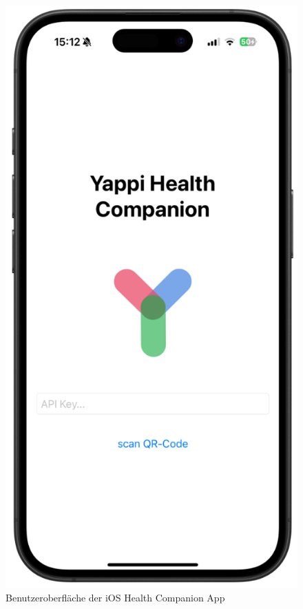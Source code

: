 \documentclass[12pt,a4paper]{report}
\begin{document}
\begin{figure}[H]
  \centering
  \includegraphics[height=0.5\textheight,keepaspectratio]{../figures/health-app.png}
  \caption{Benutzeroberfläche der iOS Health Companion App}
  \label{fig:health-app}
\end{figure}
\end{document}
